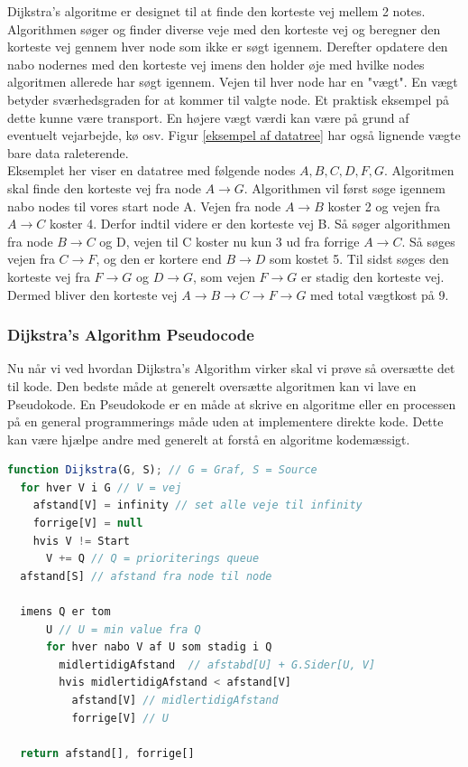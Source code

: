\documentclass[12pt]{article}
\begin{document}
Dijkstra’s algoritme er designet til at finde den korteste vej mellem 2 notes. Algorithmen søger og finder diverse veje med den korteste vej og beregner den korteste vej gennem hver node som ikke er søgt igennem. Derefter opdatere den nabo nodernes med den korteste vej imens den holder øje med hvilke nodes algoritmen allerede har søgt igennem. Vejen til hver node har en "vægt". En vægt betyder sværhedsgraden for at kommer til valgte node. Et praktisk eksempel på dette kunne være transport. En højere vægt værdi kan være på grund af eventuelt vejarbejde, kø osv. Figur \ref{eksempel af datatree} har også lignende vægte bare data raleterende.
\\Eksemplet her viser en datatree med følgende nodes $A,B,C,D,F,G$. Algoritmen skal finde den korteste vej fra node $A \rightarrow G$. Algorithmen vil først søge igennem nabo nodes til vores start node A. Vejen fra node $A \rightarrow B$ koster 2 og vejen fra $A \rightarrow C$ koster 4. Derfor indtil videre er den korteste vej B. Så søger algorithmen fra node $B \rightarrow C$ og D, vejen til C koster nu kun 3 ud fra forrige $A \rightarrow C$. Så søges vejen fra $C \rightarrow F$, og den er kortere end $B \rightarrow D$ som kostet 5. Til sidst søges den korteste vej fra $F \rightarrow G$ og $D \rightarrow G$, som vejen $F \rightarrow G$ er stadig den korteste vej. Dermed bliver den korteste vej $A \rightarrow B \rightarrow C \rightarrow F \rightarrow G$ med total vægtkost på 9. 

\subsubsection{Dijkstra’s Algorithm Pseudocode}
Nu når vi ved hvordan Dijkstra’s Algorithm virker skal vi prøve så oversætte det til kode.
Den bedste måde at generelt oversætte algoritmen kan vi lave en Pseudokode. En Pseudokode er en måde at skrive en algoritme eller en processen på en general programmerings måde uden at implementere direkte kode. Dette kan være hjælpe andre med generelt at forstå en algoritme kodemæssigt. 

\begin{lstlisting}[language=JavaScript, caption=Dijkstra’s Algorithm Pseudocode oversat til dansk]
function Dijkstra(G, S); // G = Graf, S = Source
  for hver V i G // V = vej
    afstand[V] = infinity // set alle veje til infinity
    forrige[V] = null
    hvis V != Start
      V += Q // Q = prioriterings queue
  afstand[S] // afstand fra node til node

  imens Q er tom
      U // U = min value fra Q
      for hver nabo V af U som stadig i Q
        midlertidigAfstand  // afstabd[U] + G.Sider[U, V]
        hvis midlertidigAfstand < afstand[V]
          afstand[V] // midlertidigAfstand
          forrige[V] // U

  return afstand[], forrige[]
\end{lstlisting}
\newpage
\end{document}
